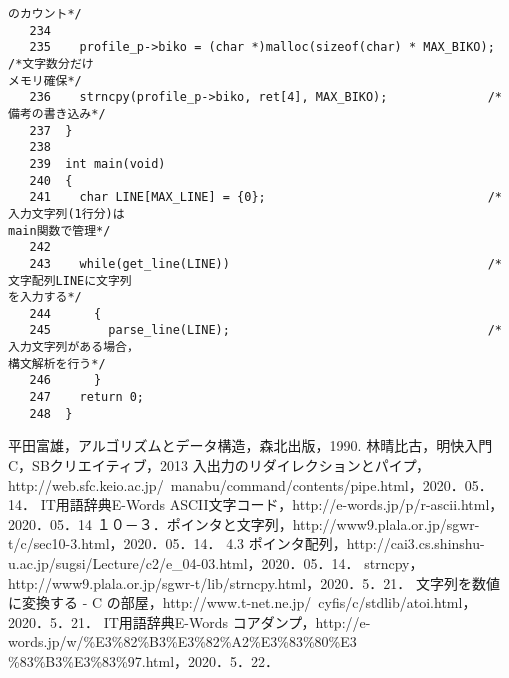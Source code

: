 \begin{Verbatim}[fontsize=\small, baselinestretch=0.8]
のカウント*/
   234	
   235	  profile_p->biko = (char *)malloc(sizeof(char) * MAX_BIKO); /*文字数分だけ
メモリ確保*/
   236	  strncpy(profile_p->biko, ret[4], MAX_BIKO);              /*備考の書き込み*/
   237	}
   238	
   239	int main(void)
   240	{
   241	  char LINE[MAX_LINE] = {0};                               /*入力文字列(1行分)は
main関数で管理*/
   242	
   243	  while(get_line(LINE))                                    /*文字配列LINEに文字列
を入力する*/
   244	    {
   245	      parse_line(LINE);                                    /*入力文字列がある場合，
構文解析を行う*/
   246	    }
   247	  return 0;
   248	}
\end{Verbatim}

\begin{thebibliography}{99}
   平田富雄，アルゴリズムとデータ構造，森北出版，1990.
   林晴比古，明快入門C，SBクリエイティブ，2013
   入出力のリダイレクションとパイプ，http://web.sfc.keio.ac.jp/~manabu/command/contents/pipe.html，2020．05．14．
   IT用語辞典E-Words ASCII文字コード，http://e-words.jp/p/r-ascii.html，2020．05．14
   １０－３．ポインタと文字列，http://www9.plala.or.jp/sgwr-t/c/sec10-3.html，2020．05．14．
   4.3 ポインタ配列，http://cai3.cs.shinshu-u.ac.jp/sugsi/Lecture/c2/e\_04-03.html，2020．05．14．%
   strncpy，http://www9.plala.or.jp/sgwr-t/lib/strncpy.html，2020．5．21．
   文字列を数値に変換する - C の部屋，http://www.t-net.ne.jp/~cyfis/c/stdlib/atoi.html，2020．5．21．
   IT用語辞典E-Words コアダンプ，http://e-words.jp/w/\%E3\%82\%B3\%E3\%82\%A2\%E3\%83\%80\%E3
\%83\%B3\%E3\%83\%97.html，2020．5．22．%
\end{thebibliography}


